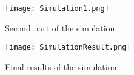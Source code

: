 \begin{figure}[h]
	\centering
	\captionsetup{justification=centering}
	\texttt{[image: Simulation1.png]}	
	\caption{Second part of the simulation}
\end{figure}
\begin{figure}[h]
	\centering
	\captionsetup{justification=centering}
	\texttt{[image: SimulationResult.png]}	
	\caption{Final results of the simulation}
\end{figure}





\clearpage